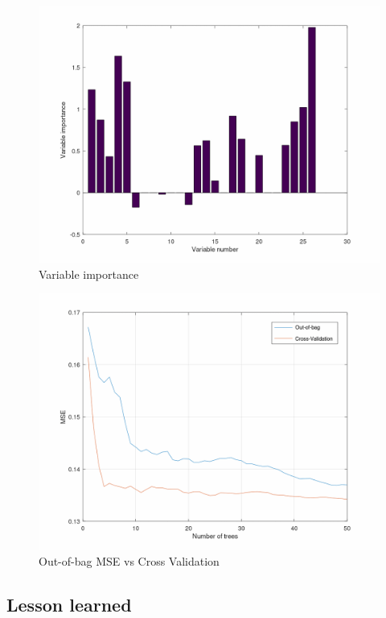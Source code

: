 \documentclass{article}
\begin{document}
\begin{figure}[H]
	\includegraphics[width=\textwidth,height=\textheight,keepaspectratio]{var_importance.png}
	\caption{Variable importance}
\end{figure}

\begin{figure}[H]
	\includegraphics[width=\textwidth,height=\textheight,keepaspectratio]{bag_vs_cv.png}
	\caption{Out-of-bag MSE vs Cross Validation}
\end{figure}

	
\subsection{Lesson learned}
\end{document}
